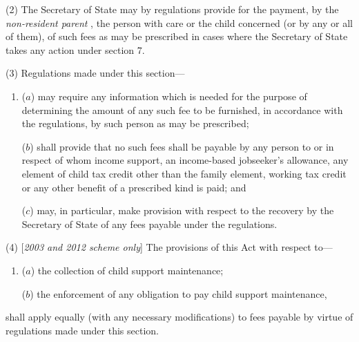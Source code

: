 \documentclass[12pt,a4paper]{article}
\begin{document}
(2) The Secretary of State may by regulations provide for the payment, by the 
\emph{non-resident parent}%
, the person with care or the child concerned (or by any or all of them), of such fees as may be prescribed in cases where the Secretary of State takes any action under section 7.

(3) Regulations made under this section—
\begin{enumerate}\item[]
($a$) may require any information which is needed for the purpose of determining the amount of any such fee to be furnished, in accordance with the regulations, by such person as may be prescribed;

($b$) shall provide that no such fees shall be payable by any person to or in respect of whom income support, 
an income-based jobseeker’s allowance,  %
any element of child tax credit other than the family element, working tax credit  %
or any other benefit of a prescribed kind is paid; and

($c$) may, in particular, make provision with respect to the recovery by the Secretary of State of any fees payable under the regulations.
\end{enumerate}

(4) [\emph{2003 and 2012 scheme only}] The provisions of this Act with respect to—
\begin{enumerate}\item[]
($a$) the collection of child support maintenance;

($b$) the enforcement of any obligation to pay child support maintenance,
\end{enumerate}
shall apply equally (with any necessary modifications) to fees payable by virtue of regulations made under this section.

\end{document}
